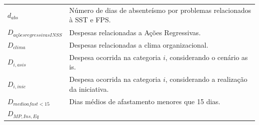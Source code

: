 \documentclass[]{article}
\begin{document}
\begin{longtable}[]{@{}ll@{}}
\begin{minipage}[t]{0.07\columnwidth}
\(d_{abs}\)\strut
\end{minipage} & \begin{minipage}[t]{0.87\columnwidth}\raggedright\strut
Número de dias de absenteísmo por problemas relacionados à SST e
FPS.\strut
\end{minipage}\tabularnewline
\begin{minipage}[t]{0.07\columnwidth}\raggedright\strut
\(D_{ações regressivas INSS}\)\strut
\end{minipage} & \begin{minipage}[t]{0.87\columnwidth}\raggedright\strut
Despesas relacionadas a Ações Regressivas.\strut
\end{minipage}\tabularnewline
\begin{minipage}[t]{0.07\columnwidth}\raggedright\strut
\(D_{clima}\)\strut
\end{minipage} & \begin{minipage}[t]{0.87\columnwidth}\raggedright\strut
Despesas relacionadas a clima organizacional.\strut
\end{minipage}\tabularnewline
\begin{minipage}[t]{0.07\columnwidth}\raggedright\strut
\(D_{i, asis}\)\strut
\end{minipage} & \begin{minipage}[t]{0.87\columnwidth}\raggedright\strut
Despesa ocorrida na categoria \(i\), considerando o cenário as is.\strut
\end{minipage}\tabularnewline
\begin{minipage}[t]{0.07\columnwidth}\raggedright\strut
\(D_{i, inic}\)\strut
\end{minipage} & \begin{minipage}[t]{0.87\columnwidth}\raggedright\strut
Despesa ocorrida na categoria \(i\), considerando a realização da
iniciativa.\strut
\end{minipage}\tabularnewline
\begin{minipage}[t]{0.07\columnwidth}\raggedright\strut
\(D_{medioafast<15}\)\strut
\end{minipage} & \begin{minipage}[t]{0.87\columnwidth}\raggedright\strut
Dias médios de afastamento menores que 15 dias.\strut
\end{minipage}\tabularnewline
\begin{minipage}[t]{0.07\columnwidth}\raggedright\strut
\(D_{MP,Ins,Eq}\)\strut
\end{minipage} & \begin{minipage}[t]{0.87\columnwidth}\raggedright\strut

\end{minipage}
\end{longtable}
\end{document}
